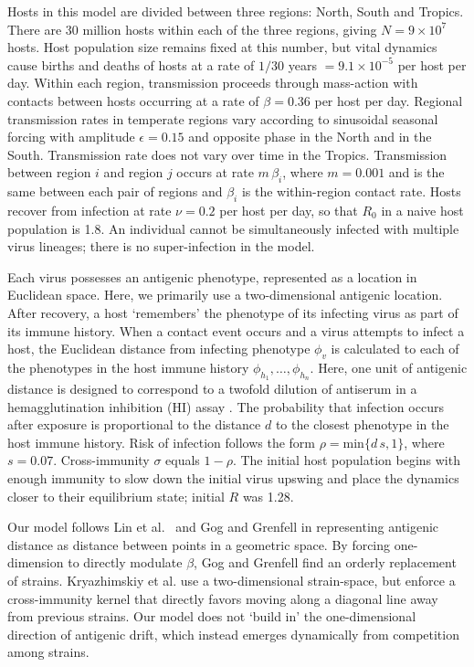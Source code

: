 \documentclass[11pt,oneside,letterpaper]{article}
\begin{document}
Hosts in this model are divided between three regions: North, South and Tropics.  There are 30 million hosts within each of the three regions, giving $N = 9 \times 10^{7}$ hosts.  Host population size remains fixed at this number, but vital dynamics cause births and deaths of hosts at a rate of $1 / 30$ years $= 9.1 \times 10^{-5}$ per host per day.  Within each region, transmission proceeds through mass-action with contacts between hosts occurring at a rate of $\beta = 0.36$ per host per day.  Regional transmission rates in temperate regions vary according to sinusoidal seasonal forcing with amplitude $\epsilon = 0.15$ and opposite phase in the North and in the South.  Transmission rate does not vary over time in the Tropics.  Transmission between region $i$ and region $j$ occurs at rate $m\,\beta_i$, where $m=0.001$ and is the same between each pair of regions and $\beta_i$ is the within-region contact rate.   Hosts recover from infection at rate $\nu = 0.2$ per host per day, so that $R_0$ in a naive host population is 1.8.  An individual cannot be simultaneously infected with multiple virus lineages; there is no super-infection in the model.

Each virus possesses an antigenic phenotype, represented as a location in Euclidean space.  Here, we primarily use a two-dimensional antigenic location.  After recovery, a host `remembers' the phenotype of its infecting virus as part of its immune history.  When a contact event occurs and a virus attempts to infect a host, the Euclidean distance from infecting phenotype $\phi_v$ is calculated to each of the phenotypes in the host immune history $\phi_{h_1}, \dots, \phi_{h_n}$.  Here, one unit of antigenic distance is designed to correspond to a twofold dilution of antiserum in a hemagglutination inhibition (HI) assay \cite{Smith04}. The probability that infection occurs after exposure is proportional to the distance $d$ to the closest phenotype in the host immune history.  Risk of infection follows the form $\rho = \textrm{min}\{d\,s,1\}$, where $s=0.07$.  Cross-immunity $\sigma$ equals $1-\rho$.  The initial host population begins with enough immunity to slow down the initial virus upswing and place the dynamics closer to their equilibrium state; initial $R$ was 1.28.

Our model follows Lin et al.\ \cite{Lin99} and Gog and Grenfell \cite{Gog02} in representing antigenic distance as distance between points in a geometric space.  By forcing one-dimension to directly modulate $\beta$, Gog and Grenfell find an orderly replacement of strains.  Kryazhimskiy et al. \cite{Kryazhimskiy07} use a two-dimensional strain-space, but enforce a cross-immunity kernel that directly favors moving along a diagonal line away from previous strains.  Our model does not `build in' the one-dimensional direction of antigenic drift, which instead emerges dynamically from competition among strains.
\end{document}

